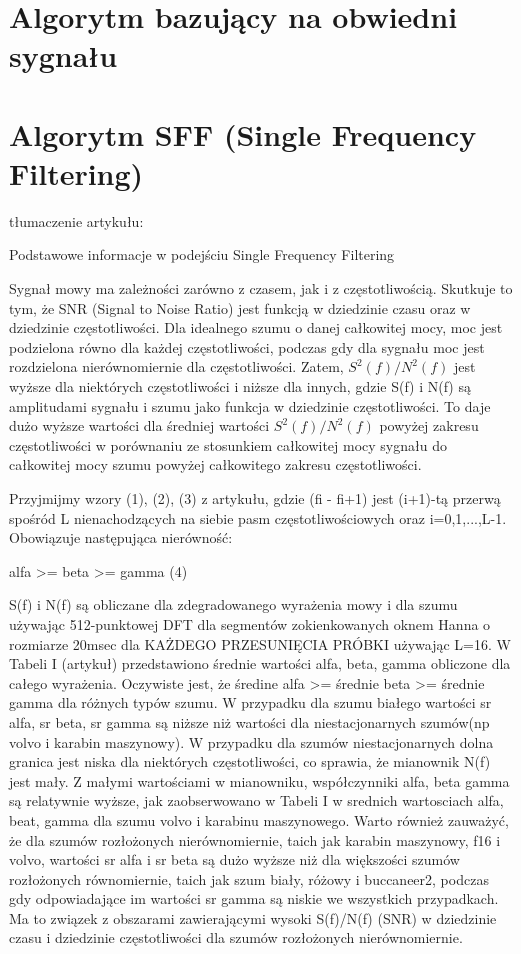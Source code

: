\documentclass[eng,printmode]{mgr}
\begin{document}
 \section{Algorytm bazujący na obwiedni sygnału}
 \section{Algorytm SFF (Single Frequency Filtering)}
 tłumaczenie artykułu:
 
 Podstawowe informacje w podejściu Single Frequency Filtering
 
 Sygnał mowy ma zależności zarówno z czasem, jak i z częstotliwością. Skutkuje to tym, że SNR (Signal to Noise Ratio) jest funkcją w dziedzinie czasu oraz w dziedzinie częstotliwości. Dla idealnego szumu o danej całkowitej mocy, moc jest podzielona równo dla każdej częstotliwości, podczas gdy dla sygnału moc jest rozdzielona nierównomiernie dla częstotliwości. Zatem, $S^2(f)/N^2(f)$ jest wyższe dla niektórych częstotliwości i niższe dla innych, gdzie S(f) i N(f) są amplitudami sygnału i szumu jako funkcja w dziedzinie częstotliwości. To daje dużo wyższe wartości dla średniej wartości  $S^2(f)/N^2(f)$ powyżej zakresu częstotliwości w porównaniu ze stosunkiem całkowitej mocy sygnału do całkowitej mocy szumu powyżej całkowitego zakresu częstotliwości. 
 
 Przyjmijmy wzory (1), (2), (3) z artykułu, gdzie (fi - fi+1)
 jest (i+1)-tą przerwą spośród L nienachodzących na siebie pasm częstotliwościowych oraz i=0,1,...,L-1. Obowiązuje następująca nierówność:
 
 alfa >= beta >= gamma (4)
 
 S(f) i N(f) są obliczane dla zdegradowanego wyrażenia mowy i dla szumu używając 512-punktowej DFT dla segmentów zokienkowanych oknem Hanna o rozmiarze 20msec dla KAŻDEGO PRZESUNIĘCIA PRÓBKI używając L=16. W Tabeli I (artykuł) przedstawiono średnie wartości alfa, beta, gamma obliczone dla całego wyrażenia. Oczywiste jest, że średine alfa >= średnie beta >= średnie gamma dla różnych typów szumu. W przypadku dla szumu białego wartości sr alfa, sr beta, sr gamma są niższe niż wartości dla niestacjonarnych szumów(np volvo i karabin maszynowy). W przypadku dla szumów niestacjonarnych dolna granica jest niska dla niektórych częstotliwości, co sprawia, że mianownik N(f) jest mały. Z małymi wartościami w mianowniku, współczynniki alfa, beta gamma są relatywnie wyższe, jak zaobserwowano w Tabeli I w srednich wartosciach alfa, beat, gamma dla szumu volvo i karabinu maszynowego. Warto również zauważyć, że dla szumów rozłożonych nierównomiernie, taich jak karabin maszynowy, f16 i volvo, wartości sr alfa i sr beta są dużo wyższe niż dla większości szumów rozłożonych równomiernie, taich jak szum biały, różowy i buccaneer2, podczas gdy odpowiadające im wartości sr gamma są niskie we wszystkich przypadkach. Ma to związek z obszarami zawierającymi wysoki S(f)/N(f) (SNR) w dziedzinie czasu i dziedzinie częstotliwości dla szumów rozłożonych nierównomiernie.
 
\end{document}
